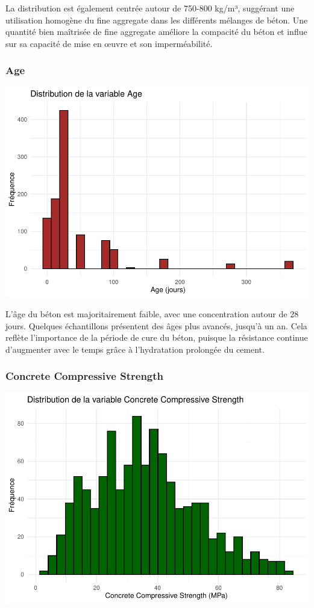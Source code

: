 \documentclass[
  12pt,
]{article}
\begin{document}
La distribution est également centrée autour de 750-800 kg/m³, suggérant
une utilisation homogène du fine aggregate dans les différents mélanges
de béton. Une quantité bien maîtrisée de fine aggregate améliore la
compacité du béton et influe sur sa capacité de mise en œuvre et son
imperméabilité.

\subsubsection{Age}\label{age}

\includegraphics{rmd_final_files/figure-latex/unnamed-chunk-8-1.pdf}

L'âge du béton est majoritairement faible, avec une concentration autour
de 28 jours. Quelques échantillons présentent des âges plus avancés,
jusqu'à un an. Cela reflète l'importance de la période de cure du béton,
puisque la résistance continue d'augmenter avec le temps grâce à
l'hydratation prolongée du cement.

\subsubsection{Concrete Compressive
Strength}\label{concrete-compressive-strength}

\includegraphics{rmd_final_files/figure-latex/unnamed-chunk-9-1.pdf}
\end{document}
